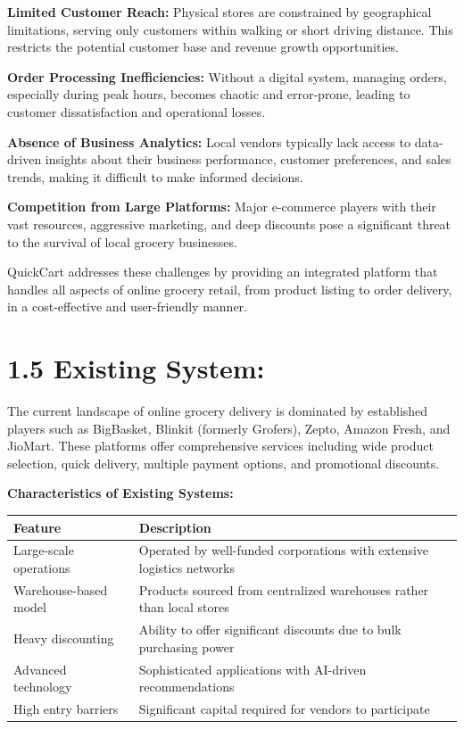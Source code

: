 \documentclass[12pt,a4paper]{report}
\begin{document}
\textbf{Limited Customer Reach:} Physical stores are constrained by geographical limitations, serving only customers within walking or short driving distance. This restricts the potential customer base and revenue growth opportunities.

\textbf{Order Processing Inefficiencies:} Without a digital system, managing orders, especially during peak hours, becomes chaotic and error-prone, leading to customer dissatisfaction and operational losses.

\textbf{Absence of Business Analytics:} Local vendors typically lack access to data-driven insights about their business performance, customer preferences, and sales trends, making it difficult to make informed decisions.

\textbf{Competition from Large Platforms:} Major e-commerce players with their vast resources, aggressive marketing, and deep discounts pose a significant threat to the survival of local grocery businesses.

QuickCart addresses these challenges by providing an integrated platform that handles all aspects of online grocery retail, from product listing to order delivery, in a cost-effective and user-friendly manner.

\section*{1.5 Existing System:}

The current landscape of online grocery delivery is dominated by established players such as BigBasket, Blinkit (formerly Grofers), Zepto, Amazon Fresh, and JioMart. These platforms offer comprehensive services including wide product selection, quick delivery, multiple payment options, and promotional discounts.

\textbf{Characteristics of Existing Systems:}

\begin{table}[h]
\centering
\begin{tabular}{|p{4cm}|p{9cm}|}
\hline
\textbf{Feature} & \textbf{Description} \\
\hline
Large-scale operations & Operated by well-funded corporations with extensive logistics networks \\
\hline
Warehouse-based model & Products sourced from centralized warehouses rather than local stores \\
\hline
Heavy discounting & Ability to offer significant discounts due to bulk purchasing power \\
\hline
Advanced technology & Sophisticated applications with AI-driven recommendations \\
\hline
High entry barriers & Significant capital required for vendors to participate \\
\hline
\end{tabular}
\end{table}
\end{document}
